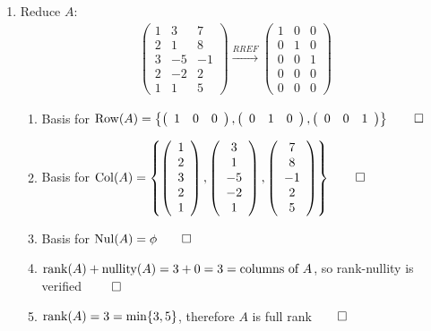 \documentclass[12pt, a4paper]{article}
\begin{document}
\begin{enumerate}[Q\arabic*.]
\begin{enumerate}[(\alph*)]
        \item Reduce $A$:
          \begin{align*}
            \left(\begin{array}{ccc} 1 & 3 & 7\\ 2 & 1 & 8\\ 3 & -5 & -1\\ 2 & -2 & 2\\ 1 & 1 & 5 \end{array}\right)
            \xrightarrow{RREF}
            \left(\begin{array}{ccc} 1 & 0 & 0\\ 0 & 1 & 0\\ 0 & 0 & 1\\ 0 & 0 & 0\\ 0 & 0 & 0 \end{array}\right)
          \end{align*}
          \begin{enumerate}[(\roman*)]
          \item Basis for $\operatorname{Row}(A) = \left\{\left(\begin{array}{ccc} 1 & 0 & 0 \end{array}\right), \left(\begin{array}{ccc} 0 & 1 & 0 \end{array}\right), \left(\begin{array}{ccc} 0 & 0 & 1 \end{array}\right)\right\} \qed$ 
            \item Basis for $\operatorname{Col}(A) = \left\{\left(\begin{array}{c} 1\\ 2\\ 3\\ 2\\ 1 \end{array}\right), \left(\begin{array}{c} 3\\ 1\\ -5\\ -2\\ 1 \end{array}\right), \left(\begin{array}{c} 7\\ 8\\ -1\\ 2\\ 5 \end{array}\right)\right\} \qed$ 
            \item Basis for $\operatorname{Nul}(A) = \phi \qed$ 
            \item $\operatorname{rank}(A) + \operatorname{nullity}(A) = 3 + 0 = 3 = \text{columns of }A$, so rank-nullity is verified $\qed$
            \item $\operatorname{rank}(A)=3=\text{min}\{3,5\}$, therefore $A$ is full rank$\qed$
          \end{enumerate}
      \end{enumerate}


\end{enumerate}
\end{document}

